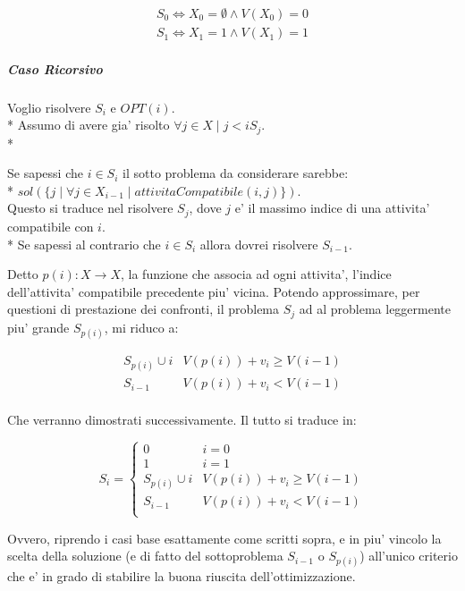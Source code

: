 \begin{align}
    \text{$S_0  \Leftrightarrow X_0 = \emptyset \land V(X_0) = 0$} \\
    \text{$S_1  \Leftrightarrow X_1 = {1} \land V(X_1) = 1$}
\end{align}

\subparagraph{Caso Ricorsivo}

Voglio risolvere $S_i$ e $OPT(i)$. \\*
Assumo di avere gia' risolto $\forall j \in X \mid j < i S_j$. \\*

Se sapessi che $i \in S_i$ il sotto problema da considerare sarebbe: \\*
$sol(\{j \mid \forall j \in X_{i-1} \mid attivitaCompatibile(i, j)\})$. \\
Questo si traduce nel risolvere $S_j$, dove $j$ e' il massimo indice di una attivita' compatibile con $i$. \\*
Se sapessi al contrario che $i \in S_i$ allora dovrei risolvere $S_{i-1}$.

Detto $p(i) : X \rightarrow X$, la funzione che associa ad ogni attivita', l'indice dell'attivita' compatibile precedente piu' vicina.
Potendo approssimare, per questioni di prestazione dei confronti, il problema $S_j$ ad al problema leggermente piu' grande $S_{p(i)}$, mi riduco a:

\begin{align}
    \text{$S_{p(i)} \cup {i}$} & \text{$V(p(i)) + v_i \geq V(i-1)$} \\
    \text{$S_{i-1}$} & \text{$V(p(i)) + v_i < V(i-1)$} \\
\end{align}

Che verranno dimostrati successivamente.
Il tutto si traduce in:

\[
    S_i =
    \begin{cases}
        \text{$0$} & \text{$i = 0$} \\
        \text{$1$} & \text{$i = 1$} \\
        \text{$S_{p(i)} \cup {i}$} & \text{$V(p(i)) + v_i \geq V(i-1)$} \\
        \text{$S_{i-1}$} & \text{$V(p(i)) + v_i < V(i-1)$} \\
    \end{cases}
\]

Ovvero, riprendo i casi base esattamente come scritti sopra, e in piu' vincolo la scelta della soluzione (e di fatto del sottoproblema $S_{i-1}$ o $S_{p(i)}$) all'unico criterio che e' in grado di stabilire la buona riuscita dell'ottimizzazione.

